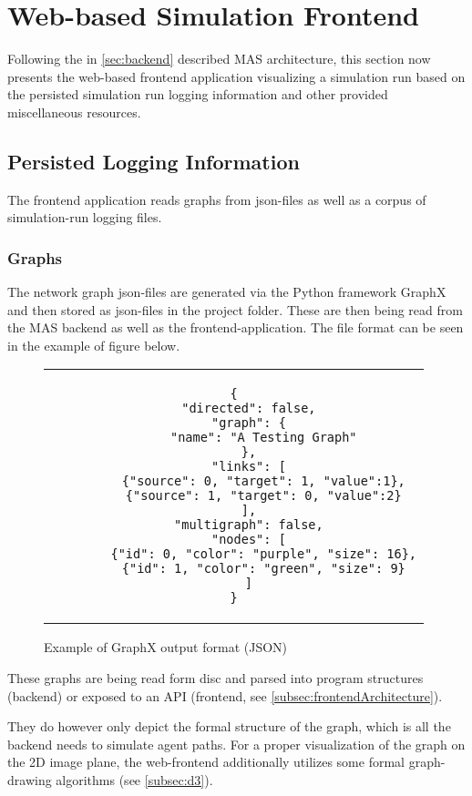 \section{Web-based Simulation Frontend}\label{sec:frontend}

Following the in \autoref{sec:backend} described MAS architecture, this section now presents the web-based frontend application visualizing a simulation run based on the persisted simulation run logging information and other provided miscellaneous resources. 


\subsection{Persisted Logging Information}

The frontend application reads graphs from json-files as well as a corpus of simulation-run logging files.

\subsubsection{Graphs}

The network graph json-files are generated via the Python framework GraphX and then stored as json-files in the project folder. These are then being read from the MAS backend as well as the frontend-application. The file format can be seen in the example of figure below.

\begin{figure}[thp]
    \label{fig:graphx}
    \centering
    \lstset{language=json, frame=single, linewidth=11cm}
    \begin{tabular}{c}
        \begin{lstlisting}
{
    "directed": false,
    "graph": {
        "name": "A Testing Graph"
    },
    "links": [
        {"source": 0, "target": 1, "value":1},
        {"source": 1, "target": 0, "value":2}
    ],
    "multigraph": false,
    "nodes": [
        {"id": 0, "color": "purple", "size": 16},
        {"id": 1, "color": "green", "size": 9}
    ]
}
        \end{lstlisting}
    \end{tabular}
    \caption{Example of GraphX output format (JSON)}
\end{figure}

These graphs are being read form disc and parsed into program structures (backend) or exposed to an API (frontend, see \autoref{subsec:frontendArchitecture}).

They do however only depict the formal structure of the graph, which is all the backend needs to simulate agent paths. For a proper visualization of the graph on the 2D image plane, the web-frontend additionally utilizes some formal graph-drawing algorithms (see \autoref{subsec:d3}).

